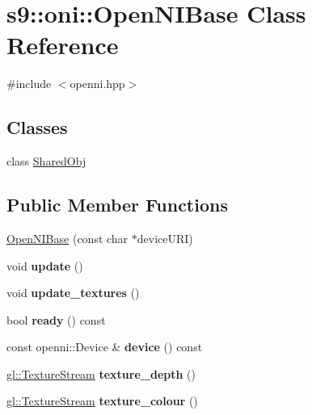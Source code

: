 \hypertarget{classs9_1_1oni_1_1OpenNIBase}{\section{s9\-:\-:oni\-:\-:Open\-N\-I\-Base Class Reference}
\label{classs9_1_1oni_1_1OpenNIBase}
}


{\ttfamily \#include $<$openni.\-hpp$>$}

\subsection*{Classes}
\begin{DoxyCompactItemize}
\item 
class \hyperlink{classs9_1_1oni_1_1OpenNIBase_1_1SharedObj}{Shared\-Obj}
\end{DoxyCompactItemize}
\subsection*{Public Member Functions}
\begin{DoxyCompactItemize}
\item 
\hyperlink{classs9_1_1oni_1_1OpenNIBase_a466d4d6f769490e0703490004d7e9dcc}{Open\-N\-I\-Base} (const char $\ast$device\-U\-R\-I)
\item 
\hypertarget{classs9_1_1oni_1_1OpenNIBase_a5b4ca88fa0300b69767f2f467c8eba6b}{void {\bfseries update} ()}\label{classs9_1_1oni_1_1OpenNIBase_a5b4ca88fa0300b69767f2f467c8eba6b}

\item 
\hypertarget{classs9_1_1oni_1_1OpenNIBase_a085e86dde9db808bad3c50f4e01beaaa}{void {\bfseries update\-\_\-textures} ()}\label{classs9_1_1oni_1_1OpenNIBase_a085e86dde9db808bad3c50f4e01beaaa}

\item 
\hypertarget{classs9_1_1oni_1_1OpenNIBase_a61e7dc25e52512b03f3bee5982313ecf}{bool {\bfseries ready} () const }\label{classs9_1_1oni_1_1OpenNIBase_a61e7dc25e52512b03f3bee5982313ecf}

\item 
\hypertarget{classs9_1_1oni_1_1OpenNIBase_ad6e2e4869b43c422a282dfe353b08cba}{const openni\-::\-Device \& {\bfseries device} () const }\label{classs9_1_1oni_1_1OpenNIBase_ad6e2e4869b43c422a282dfe353b08cba}

\item 
\hypertarget{classs9_1_1oni_1_1OpenNIBase_a1b611add3bff1206156c944c2d4f26fa}{\hyperlink{classs9_1_1gl_1_1TextureStream}{gl\-::\-Texture\-Stream} {\bfseries texture\-\_\-depth} ()}\label{classs9_1_1oni_1_1OpenNIBase_a1b611add3bff1206156c944c2d4f26fa}

\item 
\hypertarget{classs9_1_1oni_1_1OpenNIBase_a050f094eb69f9097e341b2f78ac8c995}{\hyperlink{classs9_1_1gl_1_1TextureStream}{gl\-::\-Texture\-Stream} {\bfseries texture\-\_\-colour} ()}\label{classs9_1_1oni_1_1OpenNIBase_a050f094eb69f9097e341b2f78ac8c995}

\end{DoxyCompactItemize}
